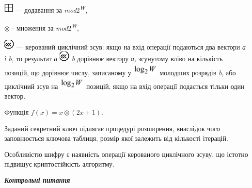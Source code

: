   \includegraphics[width=0.1874in,height=0.1874in]{crypt-img/crypt-img306.png} 
--- додавання за \textit{mod}2\textit{\textsuperscript{W}}, 

  ${\otimes}$ - множення за \textit{mod}2\textit{\textsuperscript{W}},

 \includegraphics[width=0.2083in,height=0.2083in]{crypt-img/crypt-img307.png}  ---
керований циклічний зсув: якщо на вхід операції подаються два вектори \textit{а
і }\textit{b}\textit{,} то результат  \textit{а}
\includegraphics[width=0.2083in,height=0.2083in]{crypt-img/crypt-img308.png}
\textit{ }\textit{b}\textit{ }дорівнює вектору \textit{а,} зсунутому вліво на
кількість позицій, що дорівнює числу, записаному у 
\includegraphics[width=0.5138in,height=0.25in]{crypt-img/crypt-img309.png} 
молодших розрядів \textit{b},\textit{ }або циклічний зсув на 
\includegraphics[width=0.5138in,height=0.25in]{crypt-img/crypt-img310.png}
позицій, якщо на вхід операції подається тільки один вектор.


\bigskip


\bigskip


\bigskip

Функція  $f(x)=x{\otimes}(2x+1)$.

Заданий секретний ключ підлягає процедурі розширення, внаслідок чого
заповнюється ключова таблиця, розмір якої залежить від кількості ітерацій.

Особливістю шифру є наявність операції керованого циклічного зсуву, що істотно
підвищує криптостійкість алгоритму.


\bigskip


\bigskip

{\centering\bfseries\itshape
Контрольні питання
\par}


\bigskip


\bigskip

